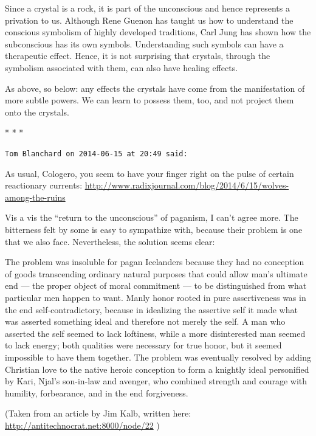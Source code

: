 Since a crystal is a rock, it is part of the unconscious and hence represents a privation to us. Although Rene Guenon has taught us how to understand the conscious symbolism of highly developed traditions, Carl Jung has shown how the subconscious has its own symbols. Understanding such symbols can have a therapeutic effect. Hence, it is not surprising that crystals, through the symbolism associated with them, can also have healing effects.

As above, so below: any effects the crystals have come from the manifestation of more subtle powers. We can learn to possess them, too, and not project them onto the crystals.



\begin{center}* * *\end{center}

\begin{footnotesize}
\begin{sffamily}
\texttt{Tom Blanchard on 2014-06-15 at 20:49 said:}

As usual, Cologero, you seem to have your finger right on the pulse of certain reactionary currents:
\url{http://www.radixjournal.com/blog/2014/6/15/wolves-among-the-ruins}


Vis a vis the ``return to the unconscious'' of paganism, I can't agree more. The bitterness felt by some is easy to sympathize with, because their problem is one that we also face. Nevertheless, the solution seems clear:

The problem was insoluble for pagan Icelanders because they had no conception of goods transcending ordinary natural purposes that could allow man's ultimate end --- the proper object of moral commitment --- to be distinguished from what particular men happen to want. Manly honor rooted in pure assertiveness was in the end self-contradictory, because in idealizing the assertive self it made what was asserted something ideal and therefore not merely the self. A man who asserted the self seemed to lack loftiness, while a more disinterested man seemed to lack energy; both qualities were necessary for true honor, but it seemed impossible to have them together. The problem was eventually resolved by adding Christian love to the native heroic conception to form a knightly ideal personified by Kari, Njal's son-in-law and avenger, who combined strength and courage with humility, forbearance, and in the end forgiveness.

(Taken from an article by Jim Kalb, written here: \url{http://antitechnocrat.net:8000/node/22} )


\end{sffamily}
\end{footnotesize}

